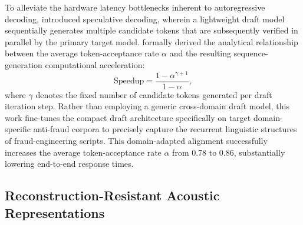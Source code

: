 \documentclass[a4paper,fleqn]{cas-sc}
\begin{document}
To alleviate the hardware latency bottlenecks inherent to autoregressive decoding, \citet{20} introduced speculative decoding, wherein a lightweight draft model sequentially generates multiple candidate tokens that are subsequently verified in parallel by the primary target model. \citet{21} formally derived the analytical relationship between the average token-acceptance rate $\alpha$ and the resulting sequence-generation computational acceleration:
\begin{equation}
\label{eq:speedup}
\text{Speedup} = \frac{1-\alpha^{\gamma+1}}{1-\alpha},
\end{equation}
where $\gamma$ denotes the fixed number of candidate tokens generated per draft iteration step. Rather than employing a generic cross-domain draft model, this work fine-tunes the compact draft architecture specifically on target domain-specific anti-fraud corpora to precisely capture the recurrent linguistic structures of fraud-engineering scripts. This domain-adapted alignment successfully increases the average token-acceptance rate $\alpha$ from 0.78 to 0.86, substantially lowering end-to-end response times.

\subsection{Reconstruction-Resistant Acoustic Representations}
\end{document}
